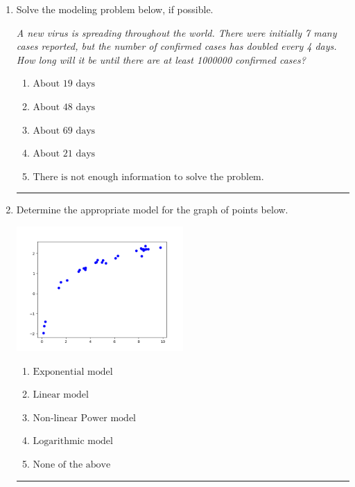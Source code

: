 \documentclass[14pt]{extbook}
\newcommand{\litem}[1]{\item#1\hspace*{-1cm}\rule{\textwidth}{0.4pt}}
\begin{document}
\begin{enumerate}
\litem{
Solve the modeling problem below, if possible.
\begin{center}
    \textit{ A new virus is spreading throughout the world. There were initially 7 many cases reported, but the number of confirmed cases has doubled every 4 days. How long will it be until there are at least 1000000 confirmed cases? }
\end{center}
\begin{enumerate}[label=\Alph*.]
\item \( \text{About } 19 \text{ days} \)
\item \( \text{About } 48 \text{ days} \)
\item \( \text{About } 69 \text{ days} \)
\item \( \text{About } 21 \text{ days} \)
\item \( \text{There is not enough information to solve the problem.} \)

\end{enumerate} }
\litem{
Determine the appropriate model for the graph of points below.
\begin{center}
    \includegraphics[width=0.5\textwidth]{../Figures/identifyModelGraph12CopyB.png}
\end{center}
\begin{enumerate}[label=\Alph*.]
\item \( \text{Exponential model} \)
\item \( \text{Linear model} \)
\item \( \text{Non-linear Power model} \)
\item \( \text{Logarithmic model} \)
\item \( \text{None of the above} \)


\end{enumerate}}
\end{enumerate}
\end{document}
